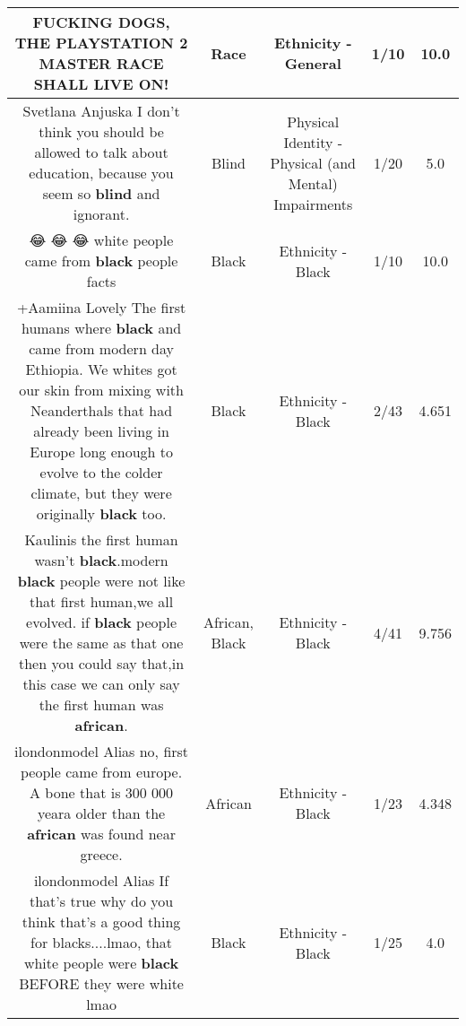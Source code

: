 \documentclass[11pt]{article}
\newlength\mylength
\begin{document}
\begin{center}
\begin{longtable}{|C{.65\mylength}|C{.30\mylength}|C{.12\mylength}|C{.12\mylength}|C{.12\mylength}|}
  \small FUCKING DOGS, THE PLAYSTATION 2 MASTER \textbf{RACE} SHALL LIVE ON!\normalsize   & Race & Ethnicity - General & 1/10 & 10.0 \\  \hline
  \small Svetlana Anjuska I don't think you should be allowed to talk about education, because you seem so \textbf{blind} and ignorant.\normalsize   & Blind & Physical Identity - Physical (and Mental) Impairments & 1/20 & 5.0 \\  \hline
  \small 😂 😂 😂 white people came from \textbf{black} people facts\normalsize   & Black & Ethnicity - Black & 1/10 & 10.0 \\  \hline
  \small +Aamiina Lovely The first humans where \textbf{black} and came from modern day Ethiopia. We whites got our skin from mixing with Neanderthals that had already been living in Europe long enough to evolve to the colder climate, but they were originally \textbf{black} too.\normalsize   & Black & Ethnicity - Black & 2/43 & 4.651 \\  \hline
  \small Kaulinis the first human wasn't \textbf{black}.modern \textbf{black} people were not like that first human,we all evolved. if \textbf{black} people were the same as that one then you could say that,in this case we can only say the first human was \textbf{african}.\normalsize   & African, Black & Ethnicity - Black & 4/41 & 9.756 \\  \hline
  \small ilondonmodel Alias no, first people came from europe. A bone that is 300 000 yeara older than the \textbf{african} was found near greece.\normalsize   & African & Ethnicity - Black & 1/23 & 4.348 \\  \hline
  \small ilondonmodel Alias If that's true why do you think that's a good thing for blacks....lmao, that white people were \textbf{black} BEFORE they were white lmao\normalsize   & Black & Ethnicity - Black & 1/25 & 4.0 \\  \hline

\end{longtable}
\end{center}
\end{document}
